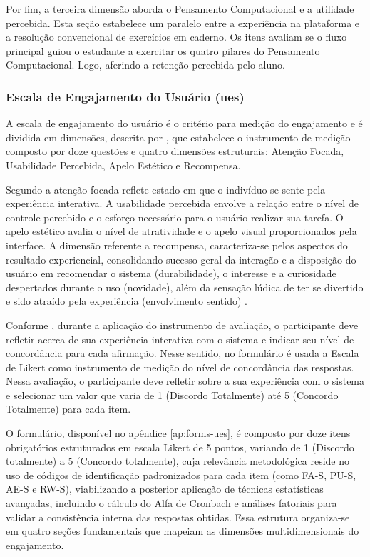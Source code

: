 Por fim, a terceira dimensão aborda o Pensamento Computacional e a utilidade
percebida. Esta seção estabelece um paralelo entre a experiência na plataforma e
a resolução convencional de exercícios em caderno. Os itens avaliam se o fluxo
principal guiou o estudante a exercitar os quatro pilares do Pensamento
Computacional. Logo, aferindo a retenção percebida pelo aluno.

\subsubsection{Escala de Engajamento do Usuário (\texorpdfstring{\acrshort{ues}}{UES})}
\label{sec:ues_form}
A escala de engajamento do usuário é o critério para medição do engajamento e é
dividida em dimensões, descrita por \cite{obrien2018practical}, que estabelece o
instrumento de medição composto por doze questões e quatro dimensões
estruturais: Atenção Focada, Usabilidade Percebida, Apelo Estético e Recompensa.

Segundo \cite{obrien2018practical} a atenção focada reflete estado em que o
indivíduo se sente pela experiência interativa. A usabilidade percebida envolve
a relação entre o nível de controle percebido e o esforço necessário para o
usuário realizar sua tarefa. O apelo estético avalia o nível de atratividade e
o apelo visual proporcionados pela interface. A dimensão referente a recompensa,
caracteriza-se pelos aspectos do resultado experiencial, consolidando sucesso
geral da interação e a disposição do usuário em recomendar o sistema
(durabilidade), o interesse e a curiosidade despertados durante o uso
(novidade), além da sensação lúdica de ter se divertido e sido atraído pela
experiência (envolvimento sentido) \cite{obrien2018practical}.

Conforme \cite{obrien2018practical}, durante a aplicação do instrumento de
avaliação, o participante deve refletir acerca de sua experiência interativa com
o sistema e indicar seu nível de concordância para cada afirmação. Nesse
sentido, no formulário é usada a Escala de Likert como instrumento de medição do
nível de concordância das respostas. Nessa avaliação, o participante deve
refletir sobre a sua experiência com o sistema e selecionar um valor que varia
de 1 (Discordo Totalmente) até 5 (Concordo Totalmente) para cada item.

O formulário, disponível no apêndice \ref{ap:forms-ues}, é composto por doze
itens obrigatórios estruturados em escala Likert de 5 pontos, variando de 1
(Discordo totalmente) a 5 (Concordo totalmente), cuja relevância metodológica
reside no uso de códigos de identificação padronizados para cada item (como
FA-S, PU-S, AE-S e RW-S), viabilizando a posterior aplicação de técnicas
estatísticas avançadas, incluindo o cálculo do Alfa de Cronbach e análises
fatoriais para validar a consistência interna das respostas obtidas. Essa
estrutura organiza-se em quatro seções fundamentais que mapeiam as dimensões
multidimensionais do engajamento.

